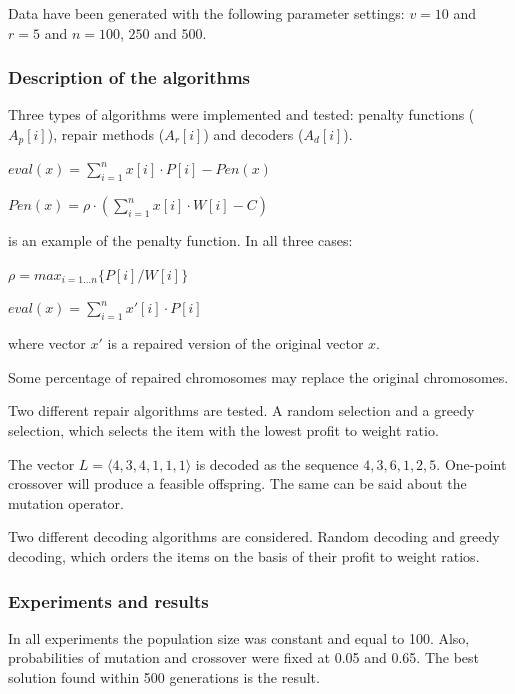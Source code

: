 \documentclass[12pt]{article}
\newcounter{subsubsubsection}[subsubsection]
\begin{document}
Data have been generated with the following parameter settings: $v = 10$ and $r = 5$ and $n = 100$, $250$ and $500$.

\subsubsection{Description of the algorithms}
Three types of algorithms were implemented and tested: penalty functions ($A_p[i]$), repair methods ($A_r[i]$) and decoders ($A_d[i]$).

\begin{center}
$eval(x) = \sum_{i=1}^{n}x[i] \cdot P[i] - Pen(x)$
\end{center}
\begin{center}
$Pen(x) = \rho \cdot (\sum_{i=1}^{n}x[i] \cdot W[i] - C)$
\end{center}
is an example of the penalty function. In all three cases:
\begin{center}
$\rho = max_{i=1 \dots n}\{P[i]/W[i]\}$
\end{center}

\begin{center}
$eval(x) = \sum_{i=1}^{n}x'[i] \cdot P[i]$
\end{center}
where vector $x'$ is a repaired version of the original vector $x$.

Some percentage of repaired chromosomes may replace the original chromosomes.

Two different repair algorithms are tested. A random selection and a greedy selection, which selects the item with the lowest profit to weight ratio.

The vector $L = \langle 4,3,4,1,1,1 \rangle$ is decoded as the sequence $4, 3, 6, 1, 2, 5$. One-point crossover will produce a feasible offspring. The same can be said about the mutation operator.

Two different decoding algorithms are considered. Random decoding and greedy decoding, which orders the items on the basis of their profit to weight ratios.

\subsubsection{Experiments and results}
In all experiments the population size was constant and equal to 100. Also, probabilities of mutation and crossover were fixed at 0.05 and 0.65. The best solution found within 500 generations is the result.
\end{document}
